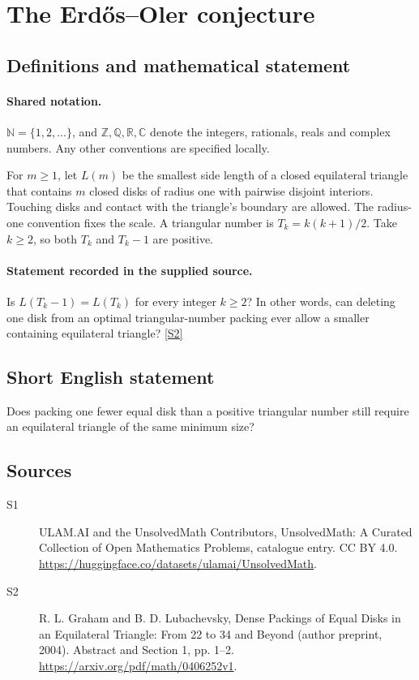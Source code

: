 \documentclass[11pt]{article}
\newcommand{\sref}[2]{\hyperlink{source:#1:#2}{[S#2]}}
\begin{document}
\section{The Erdős–Oler conjecture}\label{statement}

\subsection{Definitions and mathematical statement}

\paragraph{Shared notation.}$\mathbb N=\{1,2,\ldots\}$, and $\mathbb Z,\mathbb Q,\mathbb R,\mathbb C$ denote the integers, rationals, reals and complex numbers. Any other conventions are specified locally.


For $m\geq1$, let $L(m)$ be the smallest side length of a closed equilateral triangle that contains $m$ closed disks of radius one with pairwise disjoint interiors. Touching disks and contact with the triangle's boundary are allowed. The radius-one convention fixes the scale. A triangular number is $T_k=k(k+1)/2$. Take $k\geq2$, so both $T_k$ and $T_k-1$ are positive.
\paragraph{Statement recorded in the supplied source.}
Is $L(T_k-1)=L(T_k)$ for every integer $k\geq2$? In other words, can deleting one disk from an optimal triangular-number packing ever allow a smaller containing equilateral triangle? \sref{statement}{2}
\subsection{Short English statement}
Does packing one fewer equal disk than a positive triangular number still require an equilateral triangle of the same minimum size?
\subsection{Sources}
\begin{description}
\item[\hypertarget{source:statement:1}{S1}] ULAM.AI and the UnsolvedMath Contributors, UnsolvedMath: A Curated Collection of Open Mathematics Problems, catalogue entry. CC BY 4.0. \url{https://huggingface.co/datasets/ulamai/UnsolvedMath}.
\item[\hypertarget{source:statement:2}{S2}] R. L. Graham and B. D. Lubachevsky, Dense Packings of Equal Disks in an Equilateral Triangle: From 22 to 34 and Beyond (author preprint, 2004). Abstract and Section 1, pp. 1–2. \url{https://arxiv.org/pdf/math/0406252v1}.
\end{description}
\label{end:statement}
\end{document}
